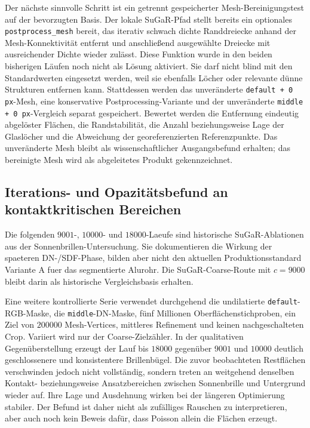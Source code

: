 \documentclass[12pt,a4paper]{article}
\begin{document}
Der nächste sinnvolle Schritt ist ein getrennt gespeicherter Mesh-Bereinigungstest auf der bevorzugten Basis. Der lokale SuGaR-Pfad stellt bereits ein optionales \texttt{postprocess\_mesh} bereit, das iterativ schwach dichte Randdreiecke anhand der Mesh-Konnektivität entfernt und anschließend ausgewählte Dreiecke mit ausreichender Dichte wieder zulässt. Diese Funktion wurde in den beiden bisherigen Läufen noch nicht als Lösung aktiviert. Sie darf nicht blind mit den Standardwerten eingesetzt werden, weil sie ebenfalls Löcher oder relevante dünne Strukturen entfernen kann. Stattdessen werden das unveränderte \texttt{default + 0\,px}-Mesh, eine konservative Postprocessing-Variante und der unveränderte \texttt{middle + 0\,px}-Vergleich separat gespeichert. Bewertet werden die Entfernung eindeutig abgelöster Flächen, die Randstabilität, die Anzahl beziehungsweise Lage der Glaslöcher und die Abweichung der georeferenzierten Referenzpunkte. Das unveränderte Mesh bleibt als wissenschaftlicher Ausgangsbefund erhalten; das bereinigte Mesh wird als abgeleitetes Produkt gekennzeichnet.

\subsection*{Iterations- und Opazitätsbefund an kontaktkritischen Bereichen}

Die folgenden $9001$-, $10000$- und $18000$-Laeufe sind historische
SuGaR-Ablationen aus der Sonnenbrillen-Untersuchung. Sie dokumentieren die
Wirkung der spaeteren DN-/SDF-Phase, bilden aber nicht den aktuellen
Produktionsstandard Variante A fuer das segmentierte Alurohr. Die
SuGaR-Coarse-Route mit $c=9000$ bleibt darin als historische Vergleichsbasis
erhalten.

Eine weitere kontrollierte Serie verwendet durchgehend die undilatierte \texttt{default}-RGB-Maske, die \texttt{middle}-DN-Maske, fünf Millionen Oberflächenstichproben, ein Ziel von $200000$ Mesh-Vertices, mittleres Refinement und keinen nachgeschalteten Crop. Variiert wird nur der Coarse-Zielzähler. In der qualitativen Gegenüberstellung erzeugt der Lauf bis $18000$ gegenüber $9001$ und $10000$ deutlich geschlossenere und konsistentere Brillenbügel. Die zuvor beobachteten Restflächen verschwinden jedoch nicht vollständig, sondern treten an weitgehend denselben Kontakt- beziehungsweise Ansatzbereichen zwischen Sonnenbrille und Untergrund wieder auf. Ihre Lage und Ausdehnung wirken bei der längeren Optimierung stabiler. Der Befund ist daher nicht als zufälliges Rauschen zu interpretieren, aber auch noch kein Beweis dafür, dass Poisson allein die Flächen erzeugt.
\end{document}
